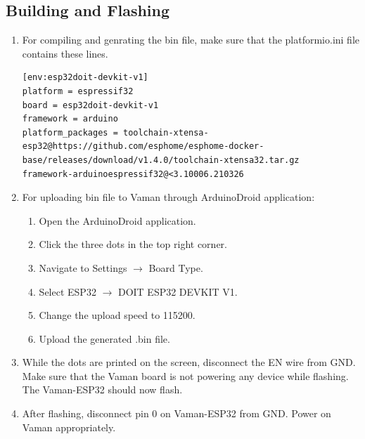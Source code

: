 \subsection{Building and Flashing}
\begin{enumerate}
\item For compiling and genrating the bin file, make sure that the
platformio.ini file contains these lines.
\begin{lstlisting}
[env:esp32doit-devkit-v1]
platform = espressif32
board = esp32doit-devkit-v1
framework = arduino
platform_packages = toolchain-xtensa-esp32@https://github.com/esphome/esphome-docker-base/releases/download/v1.4.0/toolchain-xtensa32.tar.gz                             
framework-arduinoespressif32@<3.10006.210326
\end{lstlisting}
\item For uploading bin file to Vaman through ArduinoDroid application:
\begin{enumerate}
    \item Open the ArduinoDroid application.
    \item Click the three dots in the top right corner.
    \item Navigate to Settings $\rightarrow$ Board Type.
    \item Select ESP32 $\rightarrow$ DOIT ESP32 DEVKIT V1.
    \item Change the upload speed to 115200.
    \item Upload the generated .bin file.
\end{enumerate}
\item While the dots are printed on the screen, disconnect the EN wire from GND.
Make sure that the Vaman board is not powering any device while flashing.  The
Vaman-ESP32 should now flash.
\item After flashing, disconnect pin 0 on Vaman-ESP32 from GND. Power on Vaman
appropriately.
\end{enumerate}

